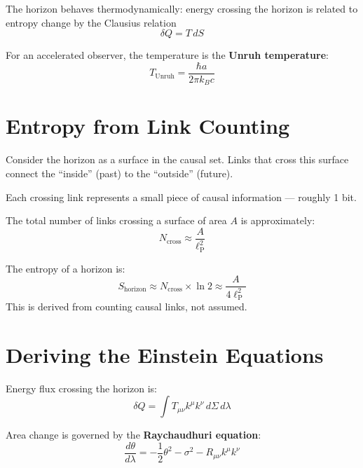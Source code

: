 \documentclass[11pt, a4paper, openany]{book}
\newcommand{\lP}{\ell_{\mathrm{P}}}
\newcounter{theorem}[chapter]
\begin{document}
\begin{axiom}
The horizon behaves thermodynamically: energy crossing the horizon is related to entropy change by the Clausius relation
\begin{equation}
\delta Q = T \, dS
\end{equation}
\end{axiom}

For an accelerated observer, the temperature is the \textbf{Unruh temperature}:
\begin{equation}
T_{\text{Unruh}} = \frac{\hbar a}{2\pi k_B c}
\end{equation}

\section{Entropy from Link Counting}

Consider the horizon as a surface in the causal set.
Links that cross this surface connect the ``inside'' (past) to the ``outside'' (future).

Each crossing link represents a small piece of causal information --- roughly 1 bit.

The total number of links crossing a surface of area $A$ is approximately:
\begin{equation}
N_{\text{cross}} \approx \frac{A}{\lP^2}
\end{equation}

\begin{theorem}
The entropy of a horizon is:
\begin{equation}
S_{\text{horizon}} \approx N_{\text{cross}} \times \ln 2 \approx \frac{A}{4 \lP^2}
\end{equation}
This is derived from counting causal links, not assumed.
\end{theorem}

\section{Deriving the Einstein Equations}

Energy flux crossing the horizon is:
\begin{equation}
\delta Q = \int T_{\mu\nu} k^\mu k^\nu \, d\Sigma \, d\lambda
\end{equation}

Area change is governed by the \textbf{Raychaudhuri equation}:
\begin{equation}
\frac{d\theta}{d\lambda} = -\frac{1}{2}\theta^2 - \sigma^2 - R_{\mu\nu} k^\mu k^\nu
\end{equation}
\end{document}

